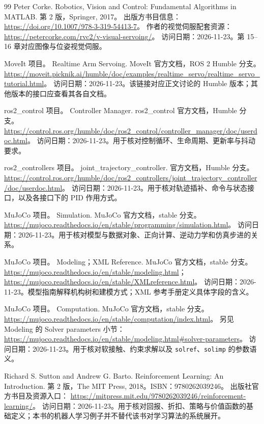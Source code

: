 \begin{thebibliography}{99}
Peter Corke.
Robotics, Vision and Control: Fundamental Algorithms in MATLAB.
第 2 版，Springer, 2017。
出版方书目信息：\url{https://doi.org/10.1007/978-3-319-54413-7}。
作者的视觉伺服配套资源：
\url{https://petercorke.com/rvc2/v-visual-servoing/}。
访问日期：2026-11-23。第 15--16 章对应图像与位姿视觉伺服。

MoveIt 项目。
Realtime Arm Servoing.
MoveIt 官方文档，ROS 2 Humble 分支。
\url{https://moveit.picknik.ai/humble/doc/examples/realtime_servo/realtime_servo_tutorial.html}。
访问日期：2026-11-23。该链接对应正文讨论的 Humble 版本；其他版本的接口应查看其各自文档。

ros2\_control 项目。
Controller Manager.
ros2\_control 官方文档，Humble 分支。
\url{https://control.ros.org/humble/doc/ros2_control/controller_manager/doc/userdoc.html}。
访问日期：2026-11-23。用于核对控制循环、生命周期、更新率与抖动要求。

ros2\_controllers 项目。
joint\_trajectory\_controller.
官方文档，Humble 分支。
\url{https://control.ros.org/humble/doc/ros2_controllers/joint_trajectory_controller/doc/userdoc.html}。
访问日期：2026-11-23。用于核对轨迹插补、命令与状态接口，以及各接口下的 PID 作用方式。

MuJoCo 项目。
Simulation.
MuJoCo 官方文档，stable 分支。
\url{https://mujoco.readthedocs.io/en/stable/programming/simulation.html}。
访问日期：2026-11-23。用于核对模型与数据对象、正向计算、逆动力学和仿真步进的关系。

MuJoCo 项目。
Modeling；XML Reference.
MuJoCo 官方文档，stable 分支。
\url{https://mujoco.readthedocs.io/en/stable/modeling.html}；
\url{https://mujoco.readthedocs.io/en/stable/XMLreference.html}。
访问日期：2026-11-23。模型指南解释机构树和建模方式；XML 参考手册定义具体字段的含义。

MuJoCo 项目。
Computation.
MuJoCo 官方文档，stable 分支。
\url{https://mujoco.readthedocs.io/en/stable/computation/index.html}。
另见 Modeling 的 Solver parameters 小节：
\url{https://mujoco.readthedocs.io/en/stable/modeling.html#solver-parameters}。
访问日期：2026-11-23。用于核对软接触、约束求解以及 \texttt{solref}、\texttt{solimp} 的参数语义。

Richard S. Sutton and Andrew G. Barto.
Reinforcement Learning: An Introduction.
第 2 版，The MIT Press, 2018。ISBN：9780262039246。
出版社官方书目及资源入口：
\url{https://mitpress.mit.edu/9780262039246/reinforcement-learning/}。
访问日期：2026-11-23。用于核对回报、折扣、策略与价值函数的基础定义；本书的机器人学习例子并不替代该书对学习算法的系统展开。


\end{thebibliography}
